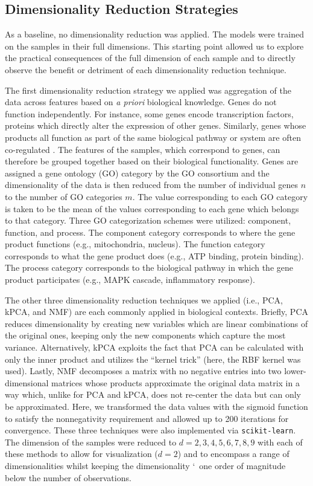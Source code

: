 \documentclass{article}
\begin{document}
\subsection{Dimensionality Reduction Strategies}

As a baseline, no dimensionality reduction was applied. The models were trained on the samples in their full dimensions. This starting point allowed us to explore the practical consequences of the full dimension of each sample and to directly observe the benefit or detriment of each dimensionality reduction technique. 

The first dimensionality reduction strategy we applied was aggregation of the data across features based on {\itshape a priori} biological knowledge. Genes do not function independently. For instance, some genes encode transcription factors, proteins which directly alter the expression of other genes. Similarly, genes whose products all function as part of the same biological pathway or system are often co-regulated \cite{LewinsGenes}. The features of the samples, which correspond to genes, can therefore be grouped together based on their biological functionality. Genes are assigned a gene ontology (GO) category by the GO consortium \cite{GO1, GO2} and the dimensionality of the data is then reduced from the number of individual genes $n$ to the number of GO categories $m$. The value corresponding to each GO category is taken to be the mean of the values corresponding to each gene which belongs to that category. Three GO categorization schemes were utilized: component, function, and process. The component category corresponds to where the gene product functions (e.g., mitochondria, nucleus). The function category corresponds to what the gene product does (e.g., ATP binding,  protein binding). The process category corresponds to the biological pathway in which the gene product participates (e.g., MAPK cascade, inflammatory response).

The other three dimensionality reduction techniques we applied (i.e., PCA, kPCA, and NMF) are each commonly applied in biological contexts. Briefly, PCA reduces dimensionality by creating new variables which are linear combinations of the original ones, keeping only the new components which capture the most variance. Alternatively, kPCA exploits the fact that PCA can be calculated with only the inner product and utilizes the ``kernel trick'' (here, the RBF kernel was used). Lastly, NMF decomposes a matrix with no negative entries into two lower-dimensional matrices whose products approximate the original data matrix in a way which, unlike for PCA and kPCA, does not re-center the data but can only be approximated. Here, we transformed the data values with the sigmoid function to satisfy the nonnegativity requirement and allowed up to 200 iterations for convergence. These three techniques were also implemented via \texttt{scikit-learn}. \cite{ScikitLearn} The dimension of the samples were reduced to $d=2,3,4,5,6,7,8,9$ with each of these methods to allow for visualization ($d=2$) and to encompass a range of dimensionalities whilst keeping the dimensionality \char`~one order of magnitude below the number of observations.
\end{document}

